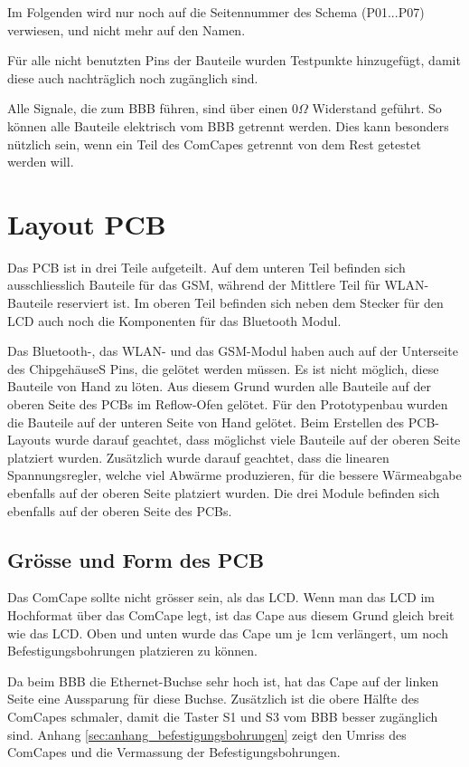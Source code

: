 Im Folgenden wird nur noch auf die Seitennummer des Schema (P01...P07) verwiesen, und nicht mehr auf den Namen.

Für alle nicht benutzten Pins der Bauteile wurden Testpunkte hinzugefügt, damit diese auch nachträglich noch zugänglich sind.

Alle Signale, die zum BBB führen, sind über einen 0$\Omega$ Widerstand geführt. So können alle Bauteile elektrisch vom BBB getrennt werden. Dies kann besonders nützlich sein, wenn ein Teil des ComCapes getrennt von dem Rest getestet werden will.


\section{Layout PCB}
Das PCB ist in drei Teile aufgeteilt. Auf dem unteren Teil befinden sich ausschliesslich Bauteile für das GSM, während der Mittlere Teil für WLAN-Bauteile reserviert ist. Im oberen Teil befinden sich neben dem Stecker für den LCD auch noch die Komponenten für das Bluetooth Modul.

Das Bluetooth-, das WLAN- und das GSM-Modul haben auch auf der Unterseite des ChipgehäuseS Pins, die gelötet werden müssen. Es ist nicht möglich, diese Bauteile von Hand zu löten. Aus diesem Grund wurden alle Bauteile auf der oberen Seite des PCBs im Reflow-Ofen gelötet. Für den Prototypenbau wurden die Bauteile auf der unteren Seite von Hand gelötet. Beim Erstellen des PCB-Layouts wurde darauf geachtet, dass möglichst viele Bauteile auf der oberen Seite platziert wurden. Zusätzlich wurde darauf geachtet, dass die linearen Spannungsregler, welche viel Abwärme produzieren, für die bessere Wärmeabgabe ebenfalls auf der oberen Seite platziert wurden. Die drei Module befinden sich ebenfalls auf der oberen Seite des PCBs.


\subsection{Grösse und Form des PCB}
Das ComCape sollte nicht grösser sein, als das LCD. Wenn man das LCD im Hochformat über das ComCape legt, ist das Cape aus diesem Grund gleich breit wie das LCD. Oben und unten wurde das Cape um je 1cm verlängert, um noch Befestigungsbohrungen platzieren zu können.

Da beim BBB die Ethernet-Buchse sehr hoch ist, hat das Cape auf der linken Seite eine Aussparung für diese Buchse. Zusätzlich ist die obere Hälfte des ComCapes schmaler, damit die Taster S1 und S3 vom BBB besser zugänglich sind. Anhang \ref{sec:anhang_befestigungsbohrungen} zeigt den Umriss des ComCapes und die Vermassung der Befestigungsbohrungen.



